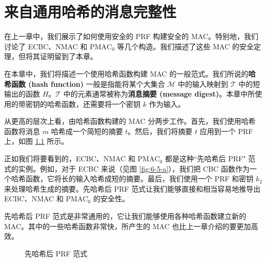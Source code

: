 \chapter{来自通用哈希的消息完整性}\label{chap:7}

在上一章中，我们展示了如何使用安全的 PRF 构建安全的 MAC。特别地，我们讨论了 ECBC、NMAC 和 $\mathrm{PMAC}_0$ 等几个构造。我们描述了这些 MAC 的安全定理，但将其证明留到了本章。

在本章中，我们将描述一个使用哈希函数构建 MAC 的一般范式。我们所说的\textbf{哈希函数 (hash function)} 一般是指能将某个大集合 $\mathcal{M}$ 中的输入映射到 $\mathcal{T}$ 中的短输出的函数 $H$。$\mathcal{T}$ 中的元素通常被称为\textbf{消息摘要 (message digest)}。本章中所使用的带密钥的哈希函数，还需要将一个密钥 $k$ 作为输入。

从更高的层次上看，由哈希函数构建的 MAC 分两步工作。首先，我们使用哈希函数将消息 $m$ 哈希成一个简短的摘要 $t$。然后，我们将摘要 $t$ 应用到一个 PRF 上，如图 \ref{fig:7-1} 所示。

正如我们将要看到的，ECBC、NMAC 和 $\mathrm{PMAC}_0$ 都是这种``先哈希后 PRF" 范式的实例。例如，对于 ECBC 来说（见图 \ref{fig:6-5-a}），我们把 CBC 函数作为一个哈希函数，它将长的输入哈希成短的摘要。最后，我们使用一个 PRF 和密钥 $k_2$ 来处理哈希生成的摘要。先哈希后 PRF 范式让我们能够直接和相当容易地推导出 ECBC、NMAC 和 $\mathrm{PMAC}_0$ 的安全性。

先哈希后 PRF 范式是非常通用的，它让我们能够使用各种哈希函数建立新的 MAC。其中的一些哈希函数非常快，所产生的 MAC 也比上一章介绍的要更加高效。

\begin{figure}
  \centering
  
  \caption{先哈希后 PRF 范式}
  \label{fig:7-1}
\end{figure}









